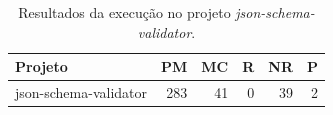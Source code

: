 \begin{table}[ht]
\centering
\caption{Resultados da execução no projeto \textit{json-schema-validator}.}
\label{tab:json-schema-validator}
\begin{tabular}{lrrrrr}
\hline
Projeto & PM & MC & R & NR & P \\
\hline
json-schema-validator & 283 & 41 & 0 & 39 & 2 \\
\hline
\end{tabular}
\end{table}
